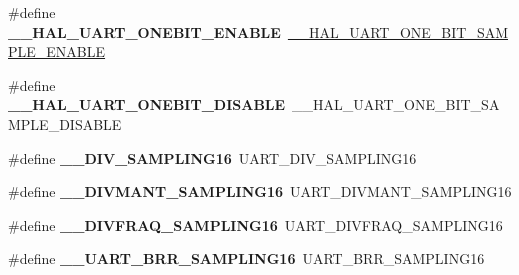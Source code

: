 \begin{DoxyCompactItemize}
\item 
\hypertarget{group___h_a_l___u_a_r_t___aliased___defines_gaf1ec2145d7a73ee2f74ec334c8210092}{\#define {\bfseries \-\_\-\-\_\-\-H\-A\-L\-\_\-\-U\-A\-R\-T\-\_\-\-O\-N\-E\-B\-I\-T\-\_\-\-E\-N\-A\-B\-L\-E}~\hyperlink{group___u_a_r_t___exported___macros_ga3524747e5896296ab066d786431503ce}{\-\_\-\-\_\-\-H\-A\-L\-\_\-\-U\-A\-R\-T\-\_\-\-O\-N\-E\-\_\-\-B\-I\-T\-\_\-\-S\-A\-M\-P\-L\-E\-\_\-\-E\-N\-A\-B\-L\-E}}\label{group___h_a_l___u_a_r_t___aliased___defines_gaf1ec2145d7a73ee2f74ec334c8210092}

\item 
\hypertarget{group___h_a_l___u_a_r_t___aliased___defines_ga93fcc521745111012558544b198be1ce}{\#define {\bfseries \-\_\-\-\_\-\-H\-A\-L\-\_\-\-U\-A\-R\-T\-\_\-\-O\-N\-E\-B\-I\-T\-\_\-\-D\-I\-S\-A\-B\-L\-E}~\-\_\-\-\_\-\-H\-A\-L\-\_\-\-U\-A\-R\-T\-\_\-\-O\-N\-E\-\_\-\-B\-I\-T\-\_\-\-S\-A\-M\-P\-L\-E\-\_\-\-D\-I\-S\-A\-B\-L\-E}\label{group___h_a_l___u_a_r_t___aliased___defines_ga93fcc521745111012558544b198be1ce}

\item 
\hypertarget{group___h_a_l___u_a_r_t___aliased___defines_ga95b08a06aee2ed42542ac95224cf13a8}{\#define {\bfseries \-\_\-\-\_\-\-D\-I\-V\-\_\-\-S\-A\-M\-P\-L\-I\-N\-G16}~U\-A\-R\-T\-\_\-\-D\-I\-V\-\_\-\-S\-A\-M\-P\-L\-I\-N\-G16}\label{group___h_a_l___u_a_r_t___aliased___defines_ga95b08a06aee2ed42542ac95224cf13a8}

\item 
\hypertarget{group___h_a_l___u_a_r_t___aliased___defines_gaae0a8a1c78ef85c5d4e980f123dce2cb}{\#define {\bfseries \-\_\-\-\_\-\-D\-I\-V\-M\-A\-N\-T\-\_\-\-S\-A\-M\-P\-L\-I\-N\-G16}~U\-A\-R\-T\-\_\-\-D\-I\-V\-M\-A\-N\-T\-\_\-\-S\-A\-M\-P\-L\-I\-N\-G16}\label{group___h_a_l___u_a_r_t___aliased___defines_gaae0a8a1c78ef85c5d4e980f123dce2cb}

\item 
\hypertarget{group___h_a_l___u_a_r_t___aliased___defines_ga165ca293ce5aa1dc825ce6e69f104f99}{\#define {\bfseries \-\_\-\-\_\-\-D\-I\-V\-F\-R\-A\-Q\-\_\-\-S\-A\-M\-P\-L\-I\-N\-G16}~U\-A\-R\-T\-\_\-\-D\-I\-V\-F\-R\-A\-Q\-\_\-\-S\-A\-M\-P\-L\-I\-N\-G16}\label{group___h_a_l___u_a_r_t___aliased___defines_ga165ca293ce5aa1dc825ce6e69f104f99}

\item 
\hypertarget{group___h_a_l___u_a_r_t___aliased___defines_ga4ef81a279eab794f777deede4ef777cd}{\#define {\bfseries \-\_\-\-\_\-\-U\-A\-R\-T\-\_\-\-B\-R\-R\-\_\-\-S\-A\-M\-P\-L\-I\-N\-G16}~U\-A\-R\-T\-\_\-\-B\-R\-R\-\_\-\-S\-A\-M\-P\-L\-I\-N\-G16}\label{group___h_a_l___u_a_r_t___aliased___defines_ga4ef81a279eab794f777deede4ef777cd}


\end{DoxyCompactItemize}
